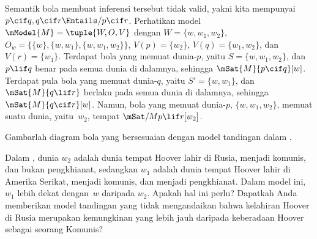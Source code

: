 \documentclass[../../../include/open-logic-section]{subfiles}
\begin{document}
\begin{ex}
  Semantik bola membuat inferensi tersebut tidak valid, yakni kita mempunyai
  $p \cif q, q \cif r \Entails/ p \cif r$. Perhatikan model $\mModel{M}
  = \tuple{W, O, V}$ dengan $W = \{w, w_1, w_2\}$, $O_w = \{\{w\}, \{w,
  w_1\}, \{w, w_1, w_2\}\}$, $V(p) = \{w_2\}$, $V(q) = \{w_1, w_2\}$,
  dan $V(r) = \{w_1\}$. Terdapat bola yang memuat dunia-$p$, yaitu $S =
  \{w, w_1, w_2\}$, dan $p \lif q$ benar pada semua dunia di dalamnya,
  sehingga $\mSat{M}{p \cif q}[w]$. Terdapat pula bola yang memuat dunia-$q$,
  yaitu $S' = \{w, w_1\}$, dan $\mSat{M}{q \lif r}$ berlaku pada semua dunia di
  dalamnya, sehingga $\mSat{M}{q \cif r}[w]$. Namun, bola yang memuat
  dunia-$p$, $\{w, w_1, w_2\}$, memuat suatu dunia, yaitu~$w_2$, tempat
  $\mSat/{M}{p \lif r}[w_2]$.
\end{ex}

\begin{prob}
Gambarlah diagram bola yang bersesuaian dengan model tandingan dalam
.
\end{prob}

\begin{prob}
  Dalam , dunia $w_2$ adalah dunia
  tempat Hoover lahir di Rusia, menjadi komunis, dan bukan pengkhianat,
  sedangkan $w_1$ adalah dunia tempat Hoover lahir di Amerika Serikat,
  menjadi komunis, dan menjadi pengkhianat. Dalam model ini, $w_1$ lebih
  dekat dengan~$w$ daripada $w_2$. Apakah hal ini perlu? Dapatkah Anda
  memberikan model tandingan yang tidak mengandaikan bahwa kelahiran Hoover
  di Rusia merupakan kemungkinan yang lebih jauh daripada keberadaan Hoover
  sebagai seorang Komunis?
\end{prob}
\end{document}
